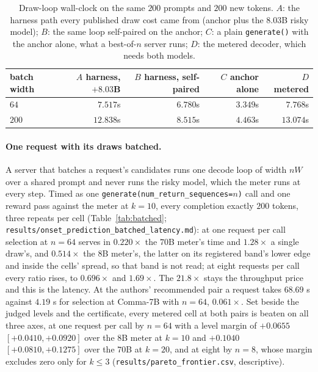 \begin{table}[ht]
\centering\footnotesize
\caption{Draw-loop wall-clock on the same $200$ prompts and $200$ new tokens. $A$: the harness path every
published draw cost came from (anchor plus the $8.03$B risky model); $B$: the same loop self-paired on the
anchor; $C$: a plain \texttt{generate()} with the anchor alone, what a best-of-$n$ server runs; $D$: the
metered decoder, which needs both models.}
\label{tab:anchoronly}
\begin{tabular}{@{}lrrrr@{}}
\toprule
batch width & $A$ harness, $+8.03$B & $B$ harness, self-paired & $C$ anchor alone & $D$ metered \\
\midrule
$64$  & $7.517$s  & $6.780$s & $3.349$s & $7.768$s \\
$200$ & $12.838$s & $8.515$s & $\mathbf{4.463}$s & $13.074$s \\
\bottomrule
\end{tabular}
\end{table}

\paragraph{One request with its draws batched.}\label{app:batched}
A server that batches a request's candidates runs one decode loop of width $nW$ over a shared prompt and
never runs the risky model, which the meter runs at every step. Timed as one
\texttt{generate(num\_\allowbreak return\_\allowbreak sequences=$n$)} call and one reward pass against the
meter at $k=10$, every completion exactly $200$ tokens, three repeats per cell (Table~\ref{tab:batched};
\texttt{results/\allowbreak onset\_\allowbreak prediction\_\allowbreak batched\_\allowbreak latency.md}):
at one request per call selection at $n=64$ serves in $0.220\times$ the $70$B meter's time and $1.28\times$ a single draw's, and
$0.514\times$ the $8$B meter's, the latter on its registered band's lower edge and inside the cells'
spread, so that band is not read; at eight requests per call every ratio rises, to $0.696\times$ and
$1.69\times$. The $21.8\times$ stays the throughput price and this is the latency. At the authors'
recommended pair a request takes $68.69$ s against $4.19$ s for selection at Comma-7B with $n=64$,
$0.061\times$. Set beside the judged levels and the certificate, every metered cell at both pairs is
beaten on all three axes, at one request per call by $n=64$ with a level margin of $+0.0655$
$[+0.0410, +0.0920]$ over the $8$B meter at $k=10$ and $+0.1040$ $[+0.0810, +0.1275]$ over the $70$B at
$k=20$, and at eight by $n=8$, whose margin excludes zero only for $k \le 3$
(\texttt{results/\allowbreak pareto\_\allowbreak frontier.csv}, descriptive).

